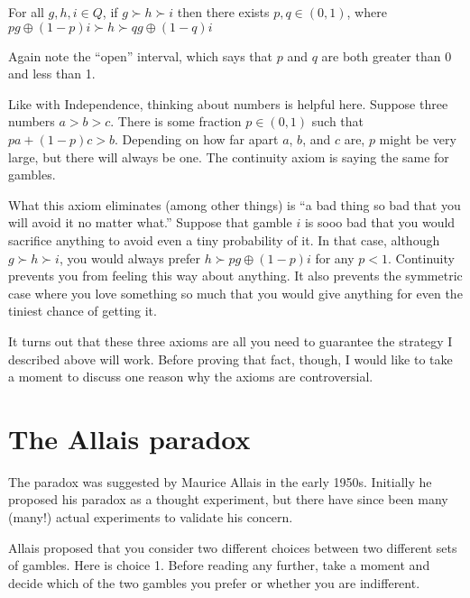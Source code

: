 
\begin{definition}
For all $g, h, i \in Q$, if $g \succ h \succ i$ then there exists $p, q \in (0,1)$, where $p g \oplus (1-p) i \succ h \succ q g \oplus (1-q) i$
\end{definition}
Again note the ``open'' interval, which says that $p$ and $q$ are both greater than 0 and less than 1.

Like with Independence, thinking about numbers is helpful here.  Suppose three numbers $a > b > c$. There is some fraction $p \in (0,1)$ such that $p a + (1-p) c > b$.  Depending on how far apart $a$, $b$, and $c$ are, $p$ might be very large, but there will always be one.  The continuity axiom is saying the same for gambles.

What this axiom eliminates (among other things) is ``a bad thing so bad that you will avoid it no matter what.''  Suppose that gamble $i$ is sooo bad that you would sacrifice anything to avoid even a tiny probability of it.  In that case, although $g \succ h \succ i$, you would always prefer $h \succ p g \oplus (1-p) i$ for any $p<1$.  Continuity prevents you from feeling this way about anything.  It also prevents the symmetric case where you love something so much that you would give anything for even the tiniest chance of getting it.

It turns out that these three axioms are all you need to guarantee the strategy I described above will work.  Before proving that fact, though, I would like to take a moment to discuss one reason why the axioms are controversial. 

\section{The Allais paradox}

 The paradox was suggested by Maurice Allais in the early 1950s.  Initially he proposed his paradox as a thought experiment, but there have since been many (many!) actual experiments to validate his concern.

Allais proposed that you consider two different choices between two different sets of gambles.  Here is choice 1. Before reading any further, take a moment and decide which of the two gambles you prefer or whether you are indifferent.

